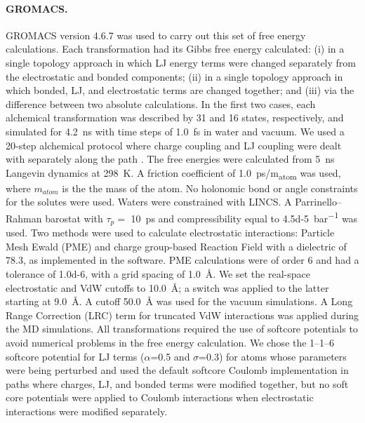 \documentclass[journal=jctcce,manuscript=article]{achemso}
\begin{document}
\paragraph{GROMACS.}
GROMACS version 4.6.7 was used to carry out this set of free energy calculations.
%
Each transformation had its Gibbs free energy calculated:
(i) in a single topology approach in which LJ energy terms were changed separately from the electrostatic and bonded components;
(ii) in a single topology approach in which bonded, LJ, and electrostatic terms are changed together; and
(iii) via the difference between two absolute calculations.
In the first two cases, each alchemical transformation was described by 31 and 16 states, respectively, and simulated for \SI{4.2}{ns} with time steps of \SI{1.0}{fs} in water and vacuum.
We used a 20-step alchemical protocol where charge coupling and LJ coupling were dealt with separately along the path \cite{Mobley2014, doi:10.1021/acs.jced.7b00104}.
%
The free energies were calculated from \SI{5}{ns} Langevin dynamics at \SI{298}{K}.
A friction coefficient of \SI{1.0}{ps/m_{atom}} was used, where $m_{atom}$ is the the mass of the atom. 
No holonomic bond or angle constraints for the solutes were used. Waters were constrained with LINCS. 
A Parrinello--Rahman barostat with $\tau_p =$ \SI{10}{ps} and compressibility equal to \SI{4.5d-5}{bar^{-1}} was used.
%
Two methods were used to calculate electrostatic interactions:
Particle Mesh Ewald (PME) and charge group-based Reaction Field with a dielectric of 78.3, as implemented in the software.
PME calculations were of order 6 and had a tolerance of \num{1.0d-6}, with a grid spacing of \SI{1.0}{\angstrom}.
We set the real-space electrostatic and VdW cutoffs to \SI{10.0}{\angstrom}; a switch was applied to the latter starting at \SI{9.0}{\angstrom}.
A cutoff \SI{50.0}{\angstrom} was used for the vacuum simulations.
%
A Long Range Correction (LRC) term for truncated VdW interactions was applied during the MD simulations.
%
All transformations required the use of softcore potentials to avoid numerical problems in the free energy calculation.
We chose the 1--1--6 softcore potential for LJ terms ($\alpha$=0.5 and $\sigma$=0.3) for atoms whose parameters were being perturbed
and used the default softcore Coulomb implementation in paths where charges, LJ, and bonded terms were modified together,
but no soft core potentials were applied to Coulomb interactions when electrostatic interactions were modified separately.
\end{document}
